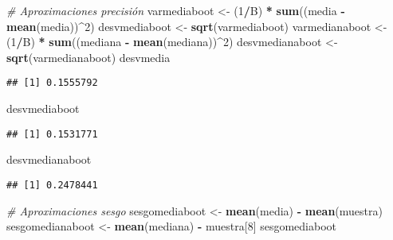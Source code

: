 \documentclass[]{book}
\newenvironment{Shaded}{\begin{snugshade}}{\end{snugshade}}
\newcommand{\KeywordTok}[1]{\textcolor[rgb]{0.13,0.29,0.53}{\textbf{#1}}}
\newcommand{\DecValTok}[1]{\textcolor[rgb]{0.00,0.00,0.81}{#1}}
\newcommand{\StringTok}[1]{\textcolor[rgb]{0.31,0.60,0.02}{#1}}
\newcommand{\CommentTok}[1]{\textcolor[rgb]{0.56,0.35,0.01}{\textit{#1}}}
\newcommand{\OperatorTok}[1]{\textcolor[rgb]{0.81,0.36,0.00}{\textbf{#1}}}
\newcommand{\NormalTok}[1]{#1}
\theoremstyle{break}
\theoremstyle{definition}
\theoremstyle{definition}
\theoremstyle{definition}
\theoremstyle{remark}
\begin{document}
\begin{Shaded}
\begin{Highlighting}[]
\CommentTok{# Aproximaciones precisión}
\NormalTok{varmediaboot <-}\StringTok{ }\NormalTok{(}\DecValTok{1}\OperatorTok{/}\NormalTok{B) }\OperatorTok{*}\StringTok{ }\KeywordTok{sum}\NormalTok{((media }\OperatorTok{-}\StringTok{ }\KeywordTok{mean}\NormalTok{(media))}\OperatorTok{^}\DecValTok{2}\NormalTok{)}
\NormalTok{desvmediaboot <-}\StringTok{ }\KeywordTok{sqrt}\NormalTok{(varmediaboot)}
\NormalTok{varmedianaboot <-}\StringTok{ }\NormalTok{(}\DecValTok{1}\OperatorTok{/}\NormalTok{B) }\OperatorTok{*}\StringTok{ }\KeywordTok{sum}\NormalTok{((mediana }\OperatorTok{-}\StringTok{ }\KeywordTok{mean}\NormalTok{(mediana))}\OperatorTok{^}\DecValTok{2}\NormalTok{)}
\NormalTok{desvmedianaboot <-}\StringTok{ }\KeywordTok{sqrt}\NormalTok{(varmedianaboot)}
\NormalTok{desvmedia}
\end{Highlighting}
\end{Shaded}

\begin{verbatim}
## [1] 0.1555792
\end{verbatim}

\begin{Shaded}
\begin{Highlighting}[]
\NormalTok{desvmediaboot}
\end{Highlighting}
\end{Shaded}

\begin{verbatim}
## [1] 0.1531771
\end{verbatim}

\begin{Shaded}
\begin{Highlighting}[]
\NormalTok{desvmedianaboot}
\end{Highlighting}
\end{Shaded}

\begin{verbatim}
## [1] 0.2478441
\end{verbatim}

\begin{Shaded}
\begin{Highlighting}[]
\CommentTok{# Aproximaciones sesgo}
\NormalTok{sesgomediaboot <-}\StringTok{ }\KeywordTok{mean}\NormalTok{(media) }\OperatorTok{-}\StringTok{ }\KeywordTok{mean}\NormalTok{(muestra)}
\NormalTok{sesgomedianaboot <-}\StringTok{ }\KeywordTok{mean}\NormalTok{(mediana) }\OperatorTok{-}\StringTok{ }\NormalTok{muestra[}\DecValTok{8}\NormalTok{]}
\NormalTok{sesgomediaboot}
\end{Highlighting}
\end{Shaded}
\end{document}
